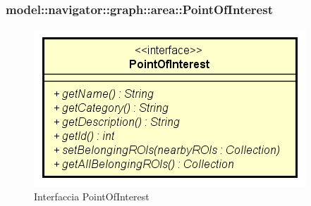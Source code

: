 \documentclass[../DefinizioneDiProdotto.tex]{subfiles}
\begin{document}
\subsubsection{model::navigator::graph::area::PointOfInterest}

    \begin{figure}[H]
        \centering
        \includegraphics{img/PointOfInterest.png}
        \caption{Interfaccia PointOfInterest}\label{fig:model::navigator::graph::area::PointOfInterest} 
    \end{figure}
\end{document}
